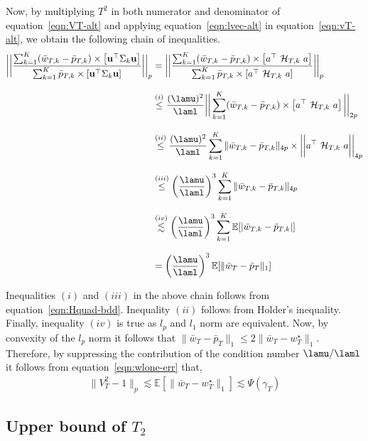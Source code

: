 \documentclass[11pt,letterpaper]{article}
\newcommand{\Exs}{\mathbb{E}}
\newcommand{\lvec}{\textbf{u}}
\theoremstyle{plain}
\theoremstyle{definition}  %
\begin{document}
\noindent Now, by multiplying $T^2$ in both numerator and denominator of equation~\eqref{eqn:VT-alt} and applying equation~\eqref{eqn:lvec-alt} in equation~\eqref{eqn:vT-alt}, we obtain the following chain of inequalities.
\vspace{5pt}
\begin{align}\label{eqn:VT-bddone}
\notag
    \bigg| \bigg| \dfrac{\sum^K_{k=1} (\bar{w}_{T,k}-\bar{p}_{T,k}) \times \left[  \lvec^{\top} \Sigma_k \lvec \right] }{\sum^K_{k=1} \bar{p}_{T,k} \times \left[ \lvec^{\top} \Sigma_k \lvec \right] } \bigg| \bigg|_p 
    &= \bigg| \bigg| \dfrac{\sum^K_{k=1} (\bar{w}_{T,k}-\bar{p}_{T,k}) \times \left[  a^\top \ \mathcal{H}_{T,k} \ a  \right] }{\sum^K_{k=1} \bar{p}_{T,k} \times \left[ a^\top \ \mathcal{H}_{T,k} \ a  \right] } \bigg| \bigg|_p \\[8pt]\notag
    & \overset{(i)}{\leq} \frac{(\lamu)^2}{\laml} \bigg| \bigg|\sum^K_{k=1} (\bar{w}_{T,k}-\bar{p}_{T,k}) \times \left[ a^\top \ \mathcal{H}_{T,k} \ a  \right] \bigg| \bigg|_{2p}\\[8pt]
    \notag
    & \overset{(ii)}{\leq} \frac{(\lamu)^2}{\laml} \sum^K_{k=1}  \| \bar{w}_{T,k}-\bar{p}_{T,k} \|_{4p} \times \bigg| \bigg| a^\top \ \mathcal{H}_{T,k} \ a   \bigg| \bigg|_{4p} \\[8pt]
    &\overset{(iii)}{\leq} \left( \frac{\lamu}{\laml}\right)^3 \sum^K_{k=1}  \| \bar{w}_{T,k}-\bar{p}_{T,k} \|_{4p} \notag\\[8pt]
    &\overset{(iv)}{\lesssim}  \left( \frac{\lamu}{\laml}\right)^3  \sum^K_{k=1}  \Exs[| \bar{w}_{T,k}-\bar{p}_{T,k} |]  \notag\\[8pt]
    &=  \left( \frac{\lamu}{\laml}\right)^3 \Exs[ \| \bar{w}_{T}-\bar{p}_{T} \|_{1}]
\end{align}


\noindent Inequalities $(i)$ and $(iii)$ in the above chain follows from equation~\eqref{eqn:Hquad-bdd}. Inequality $(ii)$ follows from Holder's inequality. Finally, inequality $(iv)$ is true as $l_p$ and $l_1$ norm are equivalent. Now, by convexity of the $l_p$ norm it follows that $\|\bar{w}_{T}-\bar{p}_{T} \|_1 \leq 2 \| \bar{w}_{T}-w^\star_{T} \|_1$.  Therefore, by suppressing the contribution of the condition number $\lamu/\laml $ it follows from equation~\eqref{eqn:wlone-err} that,
\begin{align}
     \|V^2_T-1 \|_p  \lesssim \Exs[ \|\bar{w}_T - w^\star_T \|_1] \lesssim \Psi(\gamma_T)
\end{align}

\subsection*{Upper bound of $T_2$}
\end{document}
